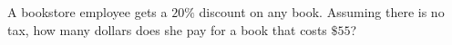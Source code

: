 A bookstore employee gets a $20\%$ discount on any book. Assuming there is no tax, how many dollars does she pay for a book that costs $\$55$?
